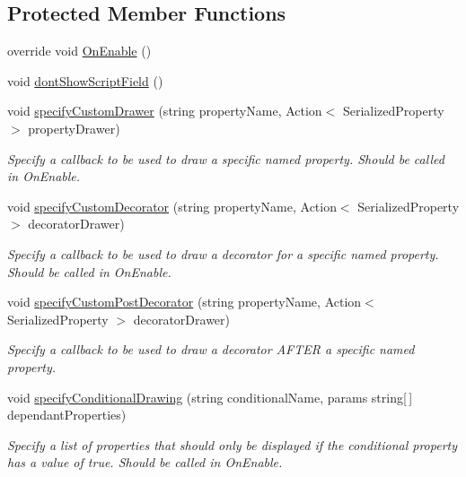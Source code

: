 \subsection*{Protected Member Functions}
\begin{DoxyCompactItemize}
\item 
override void \mbox{\hyperlink{class_leap_1_1_unity_1_1_custom_editor_base_a5c1183f1dd014fc6575cffdf1c03481b}{On\+Enable}} ()
\item 
void \mbox{\hyperlink{class_leap_1_1_unity_1_1_custom_editor_base_a08ac3b5610a14389384b3db0f8612b42}{dont\+Show\+Script\+Field}} ()
\item 
void \mbox{\hyperlink{class_leap_1_1_unity_1_1_custom_editor_base_aab8bbda3edcc92a5c3d5a5360988c265}{specify\+Custom\+Drawer}} (string property\+Name, Action$<$ Serialized\+Property $>$ property\+Drawer)
\begin{DoxyCompactList}\small\item\em Specify a callback to be used to draw a specific named property. Should be called in On\+Enable. \end{DoxyCompactList}\item 
void \mbox{\hyperlink{class_leap_1_1_unity_1_1_custom_editor_base_ac4af66143c23aa0601e20d58bb3f532e}{specify\+Custom\+Decorator}} (string property\+Name, Action$<$ Serialized\+Property $>$ decorator\+Drawer)
\begin{DoxyCompactList}\small\item\em Specify a callback to be used to draw a decorator for a specific named property. Should be called in On\+Enable. \end{DoxyCompactList}\item 
void \mbox{\hyperlink{class_leap_1_1_unity_1_1_custom_editor_base_a9b40a6fa85eec234563632935f08e7e1}{specify\+Custom\+Post\+Decorator}} (string property\+Name, Action$<$ Serialized\+Property $>$ decorator\+Drawer)
\begin{DoxyCompactList}\small\item\em Specify a callback to be used to draw a decorator A\+F\+T\+ER a specific named property. \end{DoxyCompactList}\item 
void \mbox{\hyperlink{class_leap_1_1_unity_1_1_custom_editor_base_a050b2c7054d16bc8e497877eed360664}{specify\+Conditional\+Drawing}} (string conditional\+Name, params string\mbox{[}$\,$\mbox{]} dependant\+Properties)
\begin{DoxyCompactList}\small\item\em Specify a list of properties that should only be displayed if the conditional property has a value of true. Should be called in On\+Enable. \end{DoxyCompactList}\item 

\end{DoxyCompactItemize}
